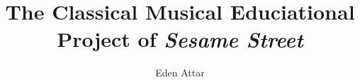 \documentclass[12pt,letterpaper]{article}
\begin{document}
	
	\title{The Classical Musical Educiational Project of \textit{Sesame Street}}
	\author{Eden Attar}
	\maketitle
	
	\doublespacing
	\thispagestyle{empty}
	

\printbibliography
\end{document}
